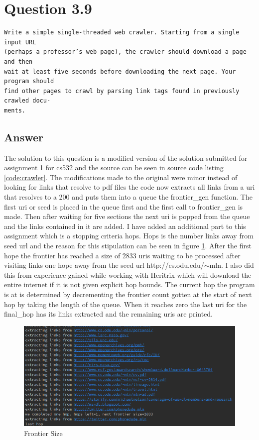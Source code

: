 \documentclass[11pt]{article}
\newenvironment{code}{\captionsetup{type=listing}}{}
\begin{document}
\begin{code}
	 \label{code:sitemap}
\end{code}
\newpage
\clearpage
\section{Question 3.9}
\begin{verbatim}
Write a simple single-threaded web crawler. Starting from a single input URL
(perhaps a professor’s web page), the crawler should download a page and then
wait at least five seconds before downloading the next page. Your program should
find other pages to crawl by parsing link tags found in previously crawled docu-
ments.
\end{verbatim}
\subsection{Answer}
\setcounter{listing}{1}
The solution to this question is a modified version of the solution submitted for assignment 1 for cs532 and the source can be seen in source code listing \hyperref[code:crawler]{\ref{code:crawler}}.
The modifications made to the original were minor instead of looking for links that resolve to pdf files the code now extracts all links from a uri that resolves to a 200 and puts them into a queue the frontier\_gen function. 
The first uri or seed is placed in the queue first and the first call to frontier\_gen is made. Then after waiting for five sections the next uri is popped from the queue and the links contained in it are added. I have added an additional part to this assignment which is a stopping criteria hops. Hops is the number links away from seed url and the reason for this stipulation can be seen in figure \hyperref[fig:frontierSize]{\ref{fig:frontierSize}}. After the first hope the frontier has reached a size of 2833 uris waiting to be processed after visiting links one hope away from the seed url http://cs.odu.edu/$\sim$mln. I also did this from experience gained while working with Heritrix which will download the entire internet if it is not given explicit hop bounds.
The current hop the program is at is determined by decrementing the frontier count gotten at the start of next hop by taking the length of the queue. When it reaches zero the last uri for the final\_hop has its links extracted and the remaining uris are printed. 
\begin{figure}[h]
	\centering
	\includegraphics[scale=0.5]{crawlerOutput.png}
	\caption{Frontier Size} \label{fig:frontierSize}
\end{figure}
\end{document}
